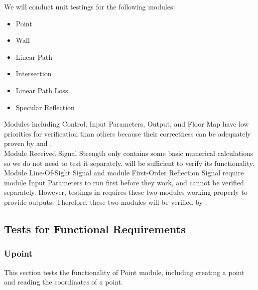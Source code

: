 \documentclass[12pt, titlepage]{article}
\begin{document}
We will conduct unit testings for the following modules:
\begin{itemize}
	\item Point
	\item Wall
	\item Linear Path
	\item Intersection
	\item Linear Path Loss
	\item Specular Reflection
\end{itemize}
Modules including Control, Input Parameters, Output, and Floor Map have low priorities for
verification than others because their correctness can be adequately proven by 
 and .\\
Module Received Signal Strength only contains some basic numerical calculations so
we do not need to test it separately.  will be sufficient to verify its functionality.\\
Module Line-Of-Sight Signal and module First-Order Reflection Signal require module Input Parameters to run first before they work, and cannot be verified separately. However, testings in  requires these two modules working properly to provide outputs. Therefore, these two modules will be verified by .

\subsection{Tests for Functional Requirements}

\subsubsection{Upoint}
\label{Point}

This section tests the functionality of Point module, including creating a point
and reading the coordinates of a point.
\end{document}
